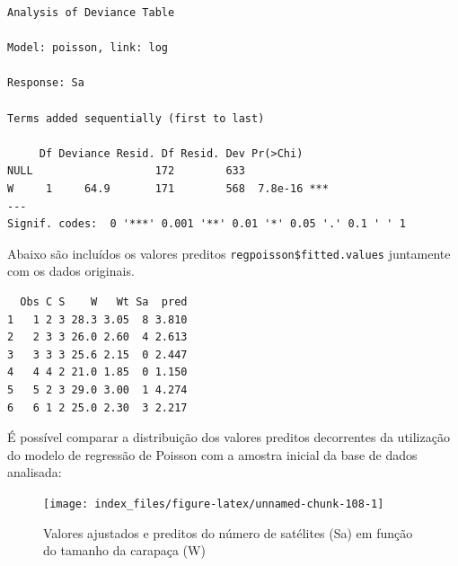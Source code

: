 \documentclass[12pt,brazil,oneside]{book}
\newenvironment{Shaded}{\begin{snugshade}}{\end{snugshade}}
\newcommand{\DataTypeTok}[1]{\textcolor[rgb]{0.13,0.29,0.53}{#1}}
\newcommand{\KeywordTok}[1]{\textcolor[rgb]{0.13,0.29,0.53}{\textbf{#1}}}
\newcommand{\NormalTok}[1]{#1}
\newcommand{\OperatorTok}[1]{\textcolor[rgb]{0.81,0.36,0.00}{\textbf{#1}}}
\newcommand{\StringTok}[1]{\textcolor[rgb]{0.31,0.60,0.02}{#1}}
\begin{document}
\begin{verbatim}
Analysis of Deviance Table

Model: poisson, link: log

Response: Sa

Terms added sequentially (first to last)

     Df Deviance Resid. Df Resid. Dev Pr(>Chi)    
NULL                   172        633             
W     1     64.9       171        568  7.8e-16 ***
---
Signif. codes:  0 '***' 0.001 '**' 0.01 '*' 0.05 '.' 0.1 ' ' 1
\end{verbatim}

Abaixo são incluídos os valores preditos \texttt{regpoisson\$fitted.values} juntamente com os dados originais.

\begin{Shaded}
\end{Shaded}

\begin{verbatim}
  Obs C S    W   Wt Sa  pred
1   1 2 3 28.3 3.05  8 3.810
2   2 3 3 26.0 2.60  4 2.613
3   3 3 3 25.6 2.15  0 2.447
4   4 4 2 21.0 1.85  0 1.150
5   5 2 3 29.0 3.00  1 4.274
6   6 1 2 25.0 2.30  3 2.217
\end{verbatim}

É possível comparar a distribuição dos valores preditos decorrentes da utilização do modelo de regressão de Poisson com a amostra inicial da base de dados analisada:

\begin{Shaded}
\end{Shaded}

\begin{figure}[H]

{\centering \texttt{[image: index\_files/figure-latex/unnamed-chunk-108-1]} 

}

\caption{Valores ajustados e preditos do número de satélites (Sa) em função do tamanho da carapaça (W)}\label{fig:unnamed-chunk-108}
\end{figure}
\end{document}
